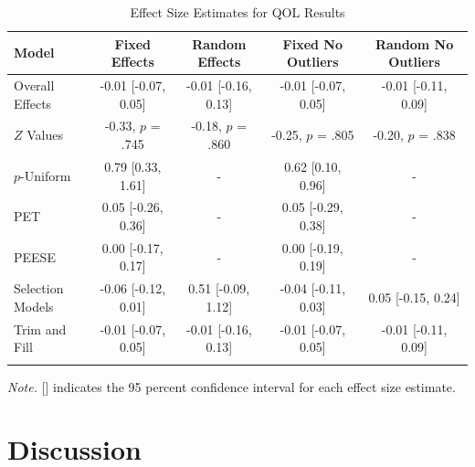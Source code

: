 \documentclass[man, mask]{apa6}
\theoremstyle{definition}
\theoremstyle{definition}
\theoremstyle{definition}
\theoremstyle{remark}
\begin{document}
\begin{table}[tbp]
\begin{center}
\begin{threeparttable}
\caption{\label{tab:QOLtable}Effect Size Estimates for QOL Results}
\small{
\begin{tabular}{lcccc}
\toprule
Model & Fixed Effects & Random Effects & Fixed No Outliers & Random No Outliers\\
\midrule
Overall Effects & -0.01 [-0.07, 0.05] & -0.01 [-0.16, 0.13] & -0.01 [-0.07, 0.05] & -0.01 [-0.11, 0.09]\\
$Z$ Values & -0.33, $p$ = .745 & -0.18, $p$ = .860 & -0.25, $p$ = .805 & -0.20, $p$ = .838\\
$p$-Uniform & 0.79 [0.33, 1.61] & - & 0.62 [0.10, 0.96] & -\\
PET & 0.05 [-0.26, 0.36] & - & 0.05 [-0.29, 0.38] & -\\
PEESE & 0.00 [-0.17, 0.17] & - & 0.00 [-0.19, 0.19] & -\\
Selection Models & -0.06 [-0.12, 0.01] & 0.51 [-0.09, 1.12] & -0.04 [-0.11, 0.03] & 0.05 [-0.15, 0.24]\\
Trim and Fill & -0.01 [-0.07, 0.05] & -0.01 [-0.16, 0.13] & -0.01 [-0.07, 0.05] & -0.01 [-0.11, 0.09]\\
\bottomrule
\addlinespace
\end{tabular}
}
\begin{tablenotes}[para]
\textit{Note.} [] indicates the 95 percent confidence interval for each effect size estimate.
\end{tablenotes}
\end{threeparttable}
\end{center}
\end{table}

\section{Discussion}\label{discussion}
\end{document}
